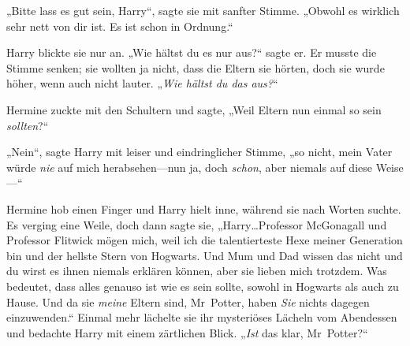 „Bitte lass es gut sein, Harry“, sagte sie mit sanfter Stimme.
„Obwohl es wirklich sehr nett von dir ist. Es ist schon in Ordnung.“

Harry blickte sie nur an.
„Wie hältst du es nur aus?“ sagte er. Er musste die Stimme senken; sie wollten ja nicht, dass die Eltern sie hörten, doch sie wurde höher, wenn auch nicht lauter. „\emph{Wie hältst du das aus?}“

Hermine zuckte mit den Schultern und sagte,
„Weil Eltern nun einmal so sein \emph{sollten}?“

„Nein“, sagte Harry mit leiser und eindringlicher Stimme, „so nicht, mein Vater würde \emph{nie} auf mich herabsehen—nun ja, doch \emph{schon}, aber niemals auf diese Weise—“

Hermine hob einen Finger und Harry hielt inne, während sie nach Worten suchte. Es verging eine Weile, doch dann sagte sie,
„Harry…Professor McGonagall und Professor Flitwick mögen mich, weil ich die talentierteste Hexe meiner Generation bin und der hellste Stern von Hogwarts. Und Mum und Dad wissen das nicht und du wirst es ihnen niemals erklären können, aber sie lieben mich trotzdem. Was bedeutet, dass alles genauso ist wie es sein sollte, sowohl in Hogwarts als auch zu Hause. Und da sie \emph{meine} Eltern sind, Mr~Potter, haben \emph{Sie} nichts dagegen einzuwenden.“ Einmal mehr lächelte sie ihr mysteriöses Lächeln vom Abendessen und bedachte Harry mit einem zärtlichen Blick. „\emph{Ist} das klar, Mr~Potter?“

